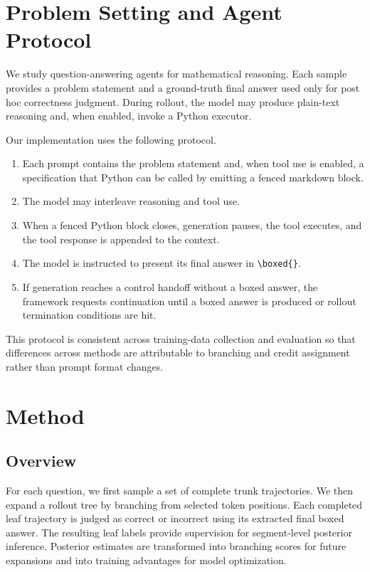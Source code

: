 \documentclass[letterpaper]{article} %
\begin{document}
\section{Problem Setting and Agent Protocol}
We study question-answering agents for mathematical reasoning. Each sample provides a problem statement and a ground-truth final answer used only for post hoc correctness judgment. During rollout, the model may produce plain-text reasoning and, when enabled, invoke a Python executor.

Our implementation uses the following protocol.
\begin{enumerate}
    \item Each prompt contains the problem statement and, when tool use is enabled, a specification that Python can be called by emitting a fenced markdown block.
    \item The model may interleave reasoning and tool use.
    \item When a fenced Python block closes, generation pauses, the tool executes, and the tool response is appended to the context.
    \item The model is instructed to present its final answer in \texttt{\textbackslash boxed\{\}}.
    \item If generation reaches a control handoff without a boxed answer, the framework requests continuation until a boxed answer is produced or rollout termination conditions are hit.
\end{enumerate}

This protocol is consistent across training-data collection and evaluation so that differences across methods are attributable to branching and credit assignment rather than prompt format changes.

\section{Method}
\subsection{Overview}
For each question, we first sample a set of complete trunk trajectories. We then expand a rollout tree by branching from selected token positions. Each completed leaf trajectory is judged as correct or incorrect using its extracted final boxed answer. The resulting leaf labels provide supervision for segment-level posterior inference. Posterior estimates are transformed into branching scores for future expansions and into training advantages for model optimization.
\end{document}
